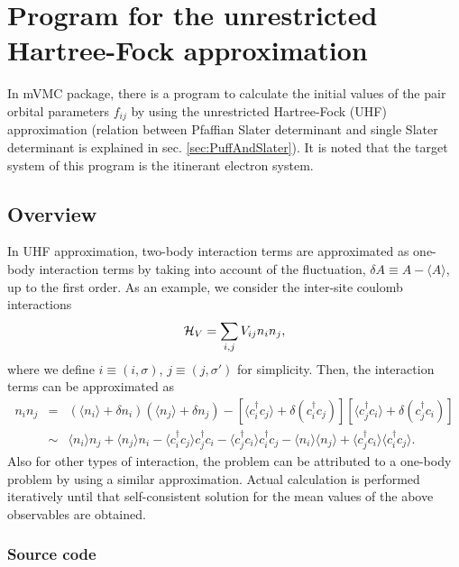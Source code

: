 \appendix
\chapter{Program for the unrestricted Hartree-Fock approximation}
\label{Ch:URHF}
In mVMC package, there is a program to calculate the initial values of the pair orbital parameters $f_{ij}$
by using the unrestricted Hartree-Fock (UHF) approximation (relation between Pfaffian Slater determinant and single Slater determinant is explained in sec. \ref{sec:PuffAndSlater}). It is noted that the target system of this program is the itinerant electron system.

\section{Overview}
In UHF approximation, two-body interaction terms are approximated as one-body interaction terms by taking into account of the fluctuation, $\delta A \equiv A-\langle A \rangle$, up to the first order. As an example, we consider the inter-site coulomb interactions 
\begin{equation}
{\cal H}_V = \sum_{i,j}V_{ij} n_ {i}n_{j},
\end{equation}
where we define $i\equiv (i, \sigma)$, $j\equiv (j, \sigma')$ for simplicity. 
Then, the interaction terms can be approximated as
\begin{eqnarray}
n_ {i}n_{j} &=& (\langle n_{i} \rangle +\delta n_i) (\langle n_{j} \rangle +\delta n_j) - \left[ \langle c_{i}^{\dag}c_j \rangle +\delta (c_{i}^{\dag}c_j ) \right] \left[ \langle c_{j}^{\dag}c_i \rangle +\delta (c_{j}^{\dag}c_i )\right] \nonumber\\
&\sim&\langle n_{i} \rangle n_j+\langle n_{j} \rangle  n_i - \langle c_{i}^{\dag}c_j \rangle  c_{j}^{\dag}c_i  -  \langle c_{j}^{\dag}c_i \rangle c_{i}^{\dag}c_j 
-\langle n_{i} \rangle \langle n_j \rangle +  \langle c_{j}^{\dag}c_i \rangle \langle c_{i}^{\dag}c_j \rangle.
\end{eqnarray}
Also for other types of interaction, the problem can be attributed to a one-body problem by using a similar approximation.
Actual calculation is performed iteratively until that self-consistent solution for the mean values of the above observables are obtained.

\subsection{Source code}

